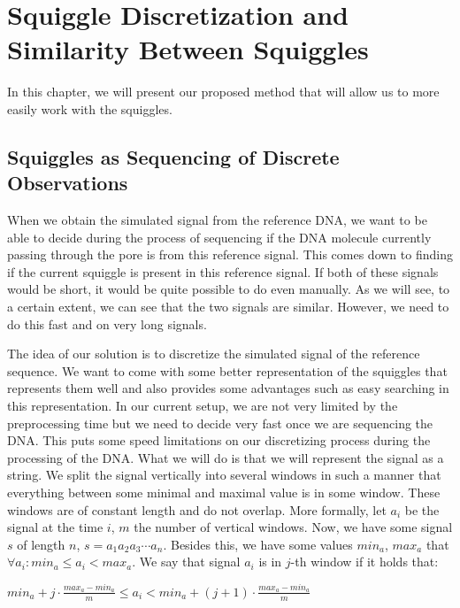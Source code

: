 \chapter{Squiggle Discretization and Similarity Between Squiggles}

\label{kap:proposedMethod} %

In this chapter, we will present our proposed method that will allow us to more
easily work with the squiggles.

\section{Squiggles as Sequencing of Discrete Observations}

When we obtain the simulated signal from the reference DNA, we want to be able
to decide during the process of sequencing if the DNA molecule currently passing
through the pore is from this reference signal. This comes down to finding if the
current squiggle is present in this reference signal. If both of these signals would
be short, it would be quite possible to do even manually. As we will see, to a
certain extent, we can see that the two signals are similar. However, we need to
do this fast and on very long signals.

The idea of our solution is to discretize the simulated signal of the
reference sequence. We want to come with some better representation of the
squiggles that represents them well and also provides some advantages such as
easy searching in this representation. In our current setup, we are
not very limited by the preprocessing time but we need to decide very fast once
we are sequencing the DNA. This puts some speed limitations on our discretizing
process during the processing of the DNA. What we will do is that we will
represent the signal as a string. We split the signal vertically into several
windows in such a manner that everything between some minimal and maximal
value is in some window. These windows are of constant length and do not
overlap. More formally, let $a_i$ be the signal at the time $i$, $m$ the number of
vertical windows. Now, we have some signal $s$ of length $n$, $s=a_1a_2a_3\cdots a_n$.
Besides this, we have some values $min_a$, $max_a$ that $\forall a_i: min_a \leq a_i < max_a$.
We say that signal $a_i$ is in $j$-th window if it holds that:

\begin{center}
$min_a + j\cdot \frac{max_a-min_a}{m} \leq a_i < min_a + (j+1)\cdot \frac{max_a-min_a}{m}$
\end{center}


